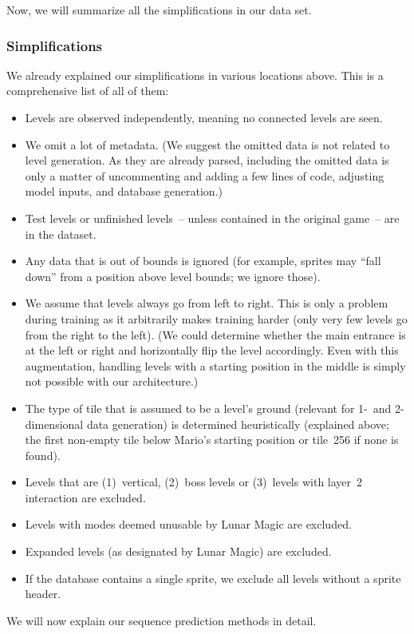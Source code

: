 Now, we will summarize all the simplifications in our data set.

\subsubsection{Simplifications}
\label{sec:simplifications}

We already explained our simplifications in various locations above.
This is a comprehensive list of all of them:
\begin{itemize}
\item Levels are observed independently, meaning no connected levels
  are seen.
\item We omit a lot of metadata. (We suggest the omitted data is not
  related to level generation. As they are already parsed, including
  the omitted data is only a matter of uncommenting and adding a few
  lines of code, adjusting model inputs, and database generation.)
\item Test levels or unfinished levels~-- unless contained in the
  original game~-- are in the dataset.
\item Any data that is out of bounds is ignored (for example, sprites
  may ``fall down'' from a position above level bounds; we ignore
  those).
\item We assume that levels always go from left to right. This is only
  a problem during training as it arbitrarily makes training harder
  (only very few levels go from the right to the left). (We could
  determine whether the main entrance is at the left or right and
  horizontally flip the level accordingly. Even with this
  augmentation, handling levels with a starting position in the middle
  is simply not possible with our architecture.)
\item The type of tile that is assumed to be a level's ground
  (relevant for 1-~and 2-dimensional data generation) is determined
  heuristically (explained above; the first non-empty tile below
  Mario's starting position or tile~256 if none is found).
\item Levels that are (1)~vertical, (2)~boss levels or (3)~levels with
  layer~2 interaction are excluded.
\item Levels with modes deemed unusable by Lunar Magic are excluded.
\item Expanded levels (as designated by Lunar Magic) are excluded.
\item If the database contains a single sprite, we exclude all levels
  without a sprite header.
\end{itemize}

We will now explain our sequence prediction methods in detail.


